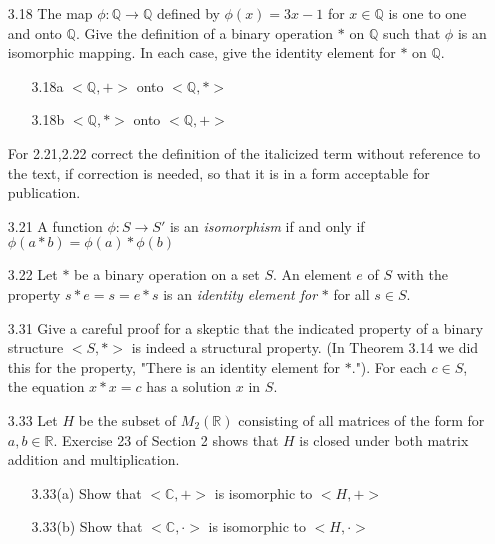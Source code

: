 \documentclass[12pt]{article}
\newcommand{\C}{\mathbb{C}}
\newcommand{\R}{\mathbb{R}}
\newcommand{\Q}{\mathbb{Q}}
\begin{document}
\begin{enumerate}
\begin{enumerate}
			\item[3.18] The map $\phi: \Q \rightarrow \Q$ defined by $\phi(x)=3x-1$ for $x \in \Q$ is one to one and onto $\Q$. Give the definition of a binary operation $\ast$ on $\Q$ such that $\phi$ is an isomorphic mapping. In each case, give the identity element for $*$ on $\Q$.
			\begin{enumerate}
				\item[3.18a]
				$<\Q,+>$ onto $<\Q,\ast>$
				\item[3.18b]
				$<\Q,\ast>$ onto $<\Q,+>$
				
			\end{enumerate}
			
			
			For 2.21,2.22 correct the definition of the italicized term without  reference to the text, if correction is needed, so that it is in a form acceptable for publication.
			
			\item[3.21] A function $\phi:S \rightarrow S'$ is an \textit{isomorphism} if and only if $\phi(a\ast b) = \phi(a) \ast \phi(b)$
			
			\item[3.22] Let $\ast$ be a binary operation on a set $S$. An element $e$ of $S$ with the property $s \ast e = s = e  \ast s$ is an \textit{identity element for} $\ast$ for all $s \in S$.
			
			\item[3.31] Give a careful proof for a skeptic that the indicated property of a binary structure $<S,\ast>$ is indeed a structural property. (In Theorem 3.14 we did this for the property, "There is an identity element for $\ast$."). For each $c \in S$, the equation $x \ast x = c$ has a solution $x$ in $S$.
			
			\item[3.33] Let $H$ be the subset of $M_2(\R)$ consisting of all matrices of the form for $a,b \in \R$. Exercise 23 of Section 2 shows that $H$ is closed under both matrix addition and multiplication.
			
			\begin{enumerate}
				\item[3.33(a)] Show that $<\C,+>$ is isomorphic to $<H,+>$ 
				\item[3.33(b)] Show that $<\C,\cdot>$ is isomorphic to $<H,\cdot>$
			\end{enumerate}
		\end{enumerate}
		
		
	\end{enumerate}
\end{document}
